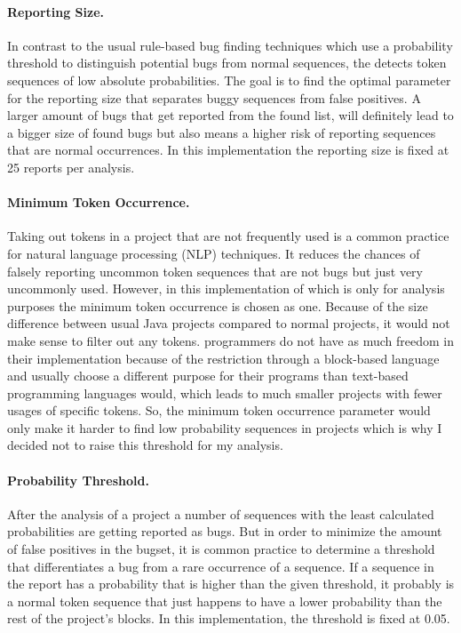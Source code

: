 \paragraph{Reporting Size.}
In contrast to the usual rule-based bug finding techniques which use a probability threshold to distinguish potential bugs from normal sequences, the \ngram{} detects token sequences of low absolute probabilities. The goal is to find the optimal parameter for the reporting size that separates buggy sequences from false positives. A larger amount of bugs that get reported from the found list, will definitely lead to a bigger size of found bugs but also means a higher risk of reporting sequences that are normal occurrences. In this implementation the reporting size is fixed at 25 reports per analysis.
\paragraph{Minimum Token Occurrence.}
Taking out tokens in a project that are not frequently used is a common practice for natural language processing (NLP) techniques. It reduces the chances of falsely reporting uncommon token sequences that are not bugs but just very uncommonly used. However, in this implementation of \ngram{} which is only for \scratch{} analysis purposes the minimum token occurrence is chosen as one. Because of the size difference between usual Java projects compared to normal \scratch{} projects, it would not make sense to filter out any tokens. \scratch{} programmers do not have as much freedom in their implementation because of the restriction through a block-based language and usually choose a different purpose for their programs than text-based programming languages would, which leads to much smaller projects with fewer usages of specific tokens. So, the minimum token occurrence parameter would only make it harder to find low probability sequences in projects which is why I decided not to raise this threshold for my analysis.
\paragraph{Probability Threshold.}
After the analysis of a project a number of sequences with the least calculated probabilities are getting reported as bugs. But in order to minimize the amount of false positives in the bugset, it is common practice to determine a threshold that differentiates a bug from a rare occurrence of a sequence. If a sequence in the report has a probability that is higher than the given threshold, it probably is a normal token sequence that just happens to have a lower probability than the rest of the project's blocks. In this implementation, the threshold is fixed at 0.05.

